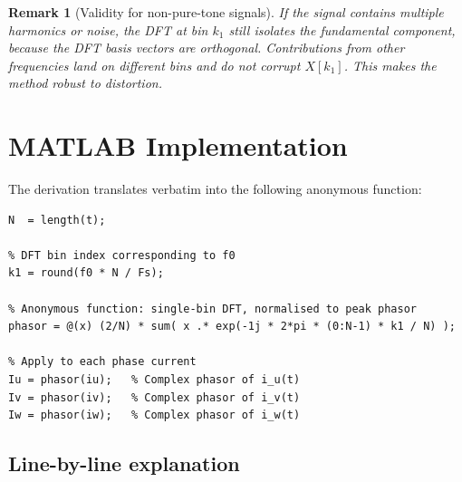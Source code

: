 \documentclass[11pt,a4paper]{article}
\newtheorem{remark}{Remark}
\begin{document}
\begin{remark}[Validity for non-pure-tone signals]
  If the signal contains multiple harmonics or noise, the DFT at bin $k_1$
  still isolates the fundamental component, because the DFT basis vectors are
  orthogonal.  Contributions from other frequencies land on different bins and
  do not corrupt $X[k_1]$.  This makes the method robust to distortion.
\end{remark}

\section{MATLAB Implementation}

The derivation translates verbatim into the following anonymous function:

\begin{lstlisting}[style=matlab, caption={Phasor extraction via single-bin DFT (MATLAB).}]
% Number of samples in one fundamental period
N  = length(t);

% DFT bin index corresponding to f0
k1 = round(f0 * N / Fs);

% Anonymous function: single-bin DFT, normalised to peak phasor
phasor = @(x) (2/N) * sum( x .* exp(-1j * 2*pi * (0:N-1) * k1 / N) );

% Apply to each phase current
Iu = phasor(iu);   % Complex phasor of i_u(t)
Iv = phasor(iv);   % Complex phasor of i_v(t)
Iw = phasor(iw);   % Complex phasor of i_w(t)
\end{lstlisting}

\subsection*{Line-by-line explanation}
\end{document}
